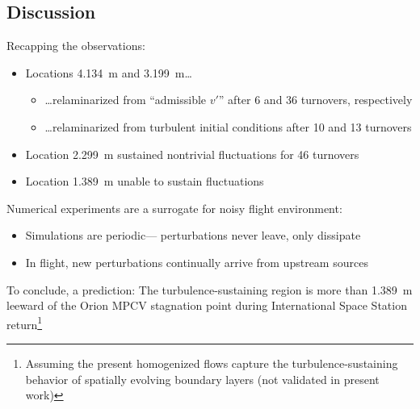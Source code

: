 \documentclass[mathserif]{beamer}
\begin{document}
\subsection{Discussion}

\begin{frame}

\begin{block}{Recapping the observations:}
\vspace{-0.5em}
\begin{itemize}
    \item Locations 4.134~m and 3.199~m\dots
        \begin{itemize}
            \item \dots{}relaminarized from ``admissible $v'$'' after 6 and 36 turnovers, respectively
            \item \dots{}relaminarized from turbulent initial conditions after 10 and 13 turnovers
        \end{itemize}
    \item Location  2.299~m sustained nontrivial fluctuations for 46 turnovers
    \item Location  1.389~m unable to sustain fluctuations
\end{itemize}
\end{block}

\pause{}
\begin{block}{Numerical experiments are a surrogate for noisy flight environment:}
\vspace{-0.5em}
\begin{itemize}
    \item Simulations are periodic--- perturbations never leave, only dissipate
    \item In flight, new perturbations continually arrive from upstream sources
\end{itemize}
\end{block}

\pause{}
\begin{block}{To conclude, a prediction:}
    \centering
    The turbulence-sustaining region is more than 1.389~m leeward of the Orion
    MPCV stagnation point during International Space Station
    return\pause\footnote{%
        Assuming the present homogenized flows capture
        the turbulence-sustaining behavior of spatially evolving boundary layers
        (not validated in present work)
    }
\end{block}

\end{frame}
\end{document}
